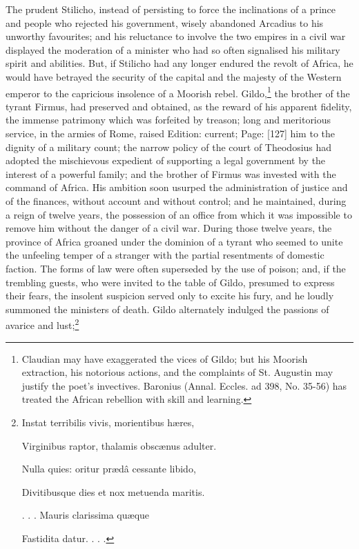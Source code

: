 The prudent Stilicho, instead of persisting to force the inclinations of a prince and people who rejected his government, wisely abandoned Arcadius to his unworthy favourites; and his reluctance to involve the two empires in a civil war displayed the moderation of a minister who had so often signalised his military spirit and abilities. But, if Stilicho had any longer endured the revolt of Africa, he would have betrayed the security of the capital and the majesty of the Western emperor to the capricious insolence of a Moorish rebel. Gildo,\footnote{Claudian may have exaggerated the vices of Gildo; but his Moorish extraction, his notorious actions, and the complaints of St. Augustin may justify the poet\texthebrew{}’s invectives. Baronius (Annal. Eccles. ad 398, No. 35-56) has treated the African rebellion with skill and learning.} the brother of the tyrant Firmus, had preserved and obtained, as the reward of his apparent fidelity, the immense patrimony which was forfeited by treason; long and meritorious service, in the armies of Rome, raised Edition: current; Page: [127] him to the dignity of a military count; the narrow policy of the court of Theodosius had adopted the mischievous expedient of supporting a legal government by the interest of a powerful family; and the brother of Firmus was invested with the command of Africa. His ambition soon usurped the administration of justice and of the finances, without account and without control; and he maintained, during a reign of twelve years, the possession of an office from which it was impossible to remove him without the danger of a civil war. During those twelve years, the province of Africa groaned under the dominion of a tyrant who seemed to unite the unfeeling temper of a stranger with the partial resentments of domestic faction. The forms of law were often superseded by the use of poison; and, if the trembling guests, who were invited to the table of Gildo, presumed to express their fears, the insolent suspicion served only to excite his fury, and he loudly summoned the ministers of death. Gildo alternately indulged the passions of avarice and lust;\footnote{Instat terribilis vivis, morientibus hæres,

Virginibus raptor, thalamis obscænus adulter.

Nulla quies: oritur prædâ cessante libido,

Divitibusque dies et nox metuenda maritis.

. . . Mauris clarissima quæque

Fastidita datur. . . .

}
